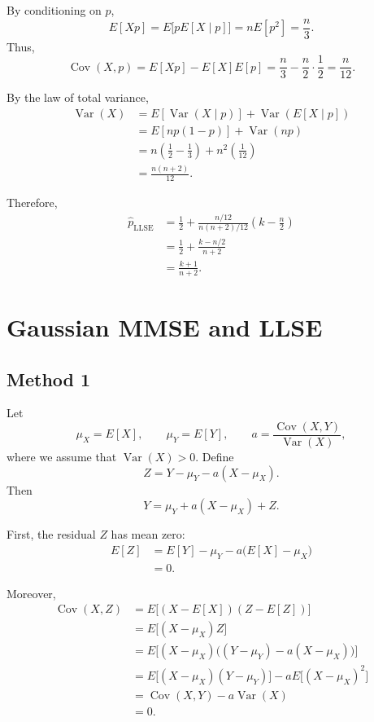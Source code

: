 \documentclass[11pt,a4paper]{article}
\begin{document}
By conditioning on $p$,
\[
E[Xp]
=
E\bigl[pE[X\mid p]\bigr]
=
nE[p^2]
=
\frac n3.
\]
Thus,
\[
\operatorname{Cov}(X,p)
=
E[Xp]-E[X]E[p]
=
\frac n3-\frac n2\cdot\frac12
=
\frac n{12}.
\]


By the law of total variance,
\begin{align*}
\operatorname{Var}(X)
&=
E[\operatorname{Var}(X\mid p)]
+
\operatorname{Var}(E[X\mid p])\\
&=
E[np(1-p)]+\operatorname{Var}(np)\\
&=
n\left(\frac12-\frac13\right)
+n^2\left(\frac1{12}\right)\\
&=
\frac{n(n+2)}{12}.
\end{align*}


Therefore,
\begin{align*}
\hat p_{\mathrm{LLSE}}
&=
\frac12+
\frac{n/12}{n(n+2)/12}
\left(k-\frac n2\right)\\
&=
\frac12+\frac{k-n/2}{n+2}\\
&=
\frac{k+1}{n+2}.
\end{align*}

\section{Gaussian MMSE and LLSE}
\subsection*{Method 1}
Let
\[
\mu_X = E[X], \qquad \mu_Y = E[Y],
\qquad
a = \frac{\operatorname{Cov}(X,Y)}{\operatorname{Var}(X)},
\]
where we assume that \(\operatorname{Var}(X)>0\).
Define
\[
Z = Y-\mu_Y-a(X-\mu_X).
\]
Then
\[
Y = \mu_Y+a(X-\mu_X)+Z.
\]

First, the residual \(Z\) has mean zero:
\begin{align*}
E[Z]
&= E[Y]-\mu_Y-a\bigl(E[X]-\mu_X\bigr)\\
&= 0.
\end{align*}

Moreover,
\begin{align*}
\operatorname{Cov}(X,Z)
&= E\bigl[(X-E[X])(Z-E[Z])\bigr]\\
&= E\bigl[(X-\mu_X)Z\bigr]\\
&= E\bigl[(X-\mu_X)
    \bigl((Y-\mu_Y)-a(X-\mu_X)\bigr)\bigr]\\
&= E\bigl[(X-\mu_X)(Y-\mu_Y)\bigr]
   -aE\bigl[(X-\mu_X)^2\bigr]\\
&= \operatorname{Cov}(X,Y)-a\operatorname{Var}(X)\\
&= 0.
\end{align*}
\end{document}
